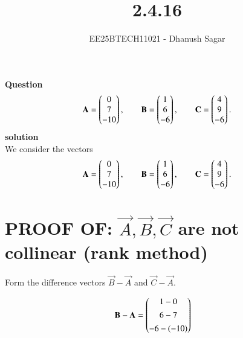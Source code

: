 \documentclass[journal]{IEEEtran}
\begin{document}



\title{2.4.16}
\author{EE25BTECH11021 - Dhanush Sagar
}
{\let\newpage\relax\maketitle}

\renewcommand{\thefigure}{\theenumi}
\renewcommand{\thetable}{\theenumi}
\setlength{\intextsep}{10pt} %


\renewcommand{\thetable}{\theenumi}


\textbf{Question}\\
\begin{align*}
\mathbf{A} = \begin{pmatrix}0\\7\\-10\end{pmatrix}, \qquad
\mathbf{B} = \begin{pmatrix}1\\6\\-6\end{pmatrix}, \qquad
\mathbf{C} = \begin{pmatrix}4\\9\\-6\end{pmatrix}.
\end{align*}
\textbf{solution}\\
We consider the vectors
\begin{align*}
\mathbf{A} = \begin{pmatrix}0\\7\\-10\end{pmatrix}, \qquad
\mathbf{B} = \begin{pmatrix}1\\6\\-6\end{pmatrix}, \qquad
\mathbf{C} = \begin{pmatrix}4\\9\\-6\end{pmatrix}.
\end{align*}

\section*{ PROOF OF: $\vec{A},\vec{B},\vec{C}$ are not collinear (rank method)}
Form the difference vectors $\vec{B}-\vec{A}$ and $\vec{C}-\vec{A}$.

\begin{align}
\mathbf{B}-\mathbf{A} &= \begin{pmatrix}1-0\\[4pt]6-7\\[4pt]-6-(-10)\end{pmatrix}
\end{align}
\end{document}
